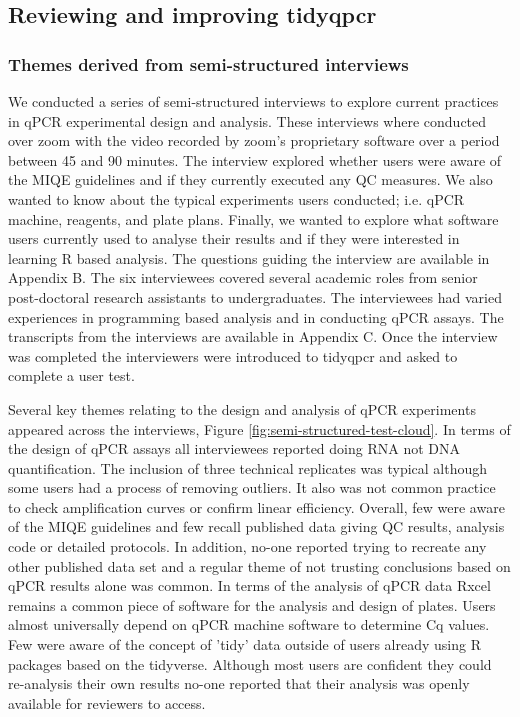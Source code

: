 \documentclass[../main.tex]{subfiles}
\begin{document}
\captionsetup[table]{list=yes}
\setcounter{table}{0}

\subsection{Reviewing and improving tidyqpcr}

\subsubsection{Themes derived from semi-structured interviews}

We conducted a series of semi-structured interviews to explore current practices in qPCR experimental design and analysis.
These interviews where conducted over zoom with the video recorded by zoom's proprietary software over a period between 45 and 90 minutes.
The interview explored whether users were aware of the MIQE guidelines and if they currently executed any QC measures. 
We also wanted to know about the typical experiments users conducted; i.e. qPCR machine, reagents, and plate plans. 
Finally, we wanted to explore what software users currently used to analyse their results and if they were interested in learning R based analysis. 
The questions guiding the interview are available in Appendix B.
The six interviewees covered several academic roles from senior post-doctoral research assistants to undergraduates.
The interviewees had varied experiences in programming based analysis and in conducting qPCR assays.
The transcripts from the interviews are available in Appendix C.
Once the interview was completed the interviewers were introduced to tidyqpcr and asked to complete a user test.

Several key themes relating to the design and analysis of qPCR experiments appeared across the interviews, Figure \ref{fig:semi-structured-test-cloud}.
In terms of the design of qPCR assays all interviewees reported doing RNA not DNA quantification.
The inclusion of three technical replicates was typical although some users had a process of removing outliers.
It also was not common practice to check amplification curves or confirm linear efficiency.
Overall, few were aware of the MIQE guidelines and few recall published data giving QC results, analysis code or detailed protocols.
In addition, no-one reported trying to recreate any other published data set and a regular theme of not trusting conclusions based on qPCR results alone was common.
In terms of the analysis of qPCR data Rxcel remains a common piece of software for the analysis and design of plates.
Users almost universally depend on qPCR machine software to determine Cq values.
Few were aware of the concept of 'tidy' data outside of users already using R packages  based on the tidyverse.
Although most users are confident they could re-analysis their own results no-one reported that their analysis was openly available for reviewers to access.
\end{document}
